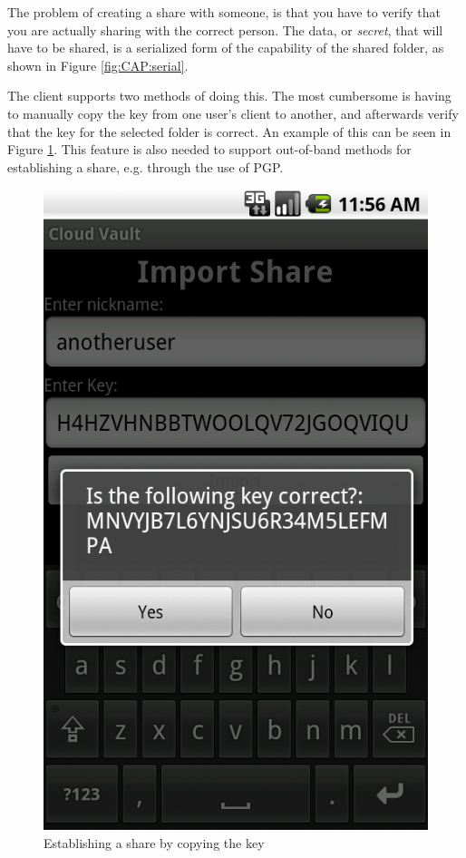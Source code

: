 \documentclass[pdftex,english,10pt,b5paper,twoside]{book}
\begin{document}
The problem of creating a share with someone, is that you have to verify that
you are actually sharing with the correct person. The data, or \emph{secret},
that will have to be shared, is a serialized form of the capability of the
shared folder, as shown in Figure \ref{fig:CAP:serial}.

The client supports two methods of doing this. The most cumbersome is having to
manually copy the key from one user's client to another, and afterwards verify
that the key for the selected folder is correct. An example of this can be seen
in Figure \ref{fig:CSVAndroid:manualimport}. This feature is also needed to
support out-of-band methods for establishing a share, e.g. through the use of
\ac{PGP}.

\begin{figure}[h!]
    \centering
    \includegraphics[scale=0.4]{client-manualimport.png}
    \caption{Establishing a share by copying the key}
    \label{fig:CSVAndroid:manualimport}
\end{figure}
\end{document}
